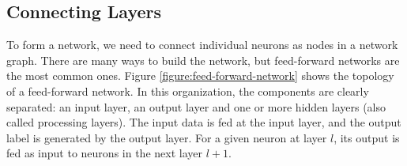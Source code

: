 \documentclass[12pt]{report}
\begin{document}
	\subsection {Connecting Layers}
	To form a network, we  need to connect individual neurons as nodes in a network graph. There are many ways to build the network, but feed-forward networks are the most common ones.  Figure \ref{figure:feed-forward-network}  shows the topology of a feed-forward network. In this organization, the components are clearly separated: an input layer, an output layer and one or more hidden layers (also called processing layers). The input data is fed at
	the input layer, and the output label is  generated by the output layer. For a given neuron at layer $l$, its output is fed as input to neurons in the next layer $l + 1$. 
	
	
\end{document}
